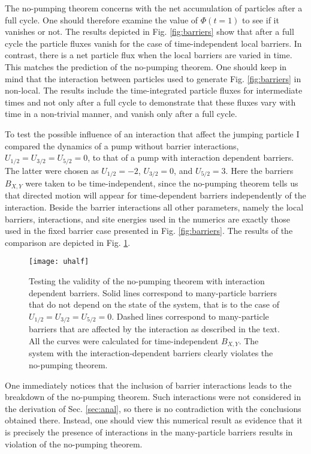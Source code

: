 \documentclass[aps,pre,showpacs,amsmath,amssymb,amsfonts,superscriptaddress,onecolumn,longbibliography]{revtex4-1}
\begin{document}
The no-pumping theorem concerns with the net accumulation of particles after a full cycle. One should therefore examine the value of $\Phi(t=1)$ to see if it vanishes or not. The results depicted
in Fig. \ref{fig:barriers} show that after a full cycle the particle fluxes vanish for the case of time-independent local barriers. In contrast, there is a net particle flux when the local barriers are varied in
time. This matches the prediction of the no-pumping theorem. One should keep in mind that the interaction between particles used to generate Fig. \ref{fig:barriers} in non-local.
The results include the time-integrated particle fluxes for intermediate times and not only after a full cycle to demonstrate that these fluxes vary with time in a non-trivial manner, and vanish only after a full cycle.

To test the possible influence of an interaction that affect the jumping particle I compared the dynamics of a pump without barrier interactions,
$U_{1/2}=U_{3/2}=U_{5/2}=0$, to that of a pump with interaction dependent barriers. The latter were chosen as  $U_{1/2}=-2$, $U_{3/2}=0$, and $U_{5/2}=3$. Here the barriers
 $B_{X,Y}$ were taken to be time-independent, since the no-pumping theorem tells us that directed motion will appear for time-dependent barriers independently of the interaction. Beside the barrier interactions all other parameters, namely the local barriers, interactions, and site energies used in the numerics are exactly those
used in the fixed barrier case presented in Fig. \ref{fig:barriers}.
The results of the comparison are depicted in Fig. \ref{fig:uhalf}.
\begin{figure}[h]
\texttt{[image: uhalf]}

\caption{Testing the validity of the no-pumping theorem with interaction dependent barriers. Solid lines correspond to many-particle barriers that do not depend on the state of the system, that is to the case of $U_{1/2}=U_{3/2}=U_{5/2}=0$. Dashed lines correspond to many-particle barriers that are affected by the interaction as described in the text. All the curves were
calculated for time-independent $B_{X,Y}$. The system with the interaction-dependent barriers clearly violates the no-pumping theorem. \label{fig:uhalf}}
\end{figure}

One immediately notices that the inclusion of barrier interactions leads to the breakdown of the no-pumping theorem. Such interactions were not considered
in the derivation of Sec. \ref{sec:anal}, so there is no contradiction with the conclusions obtained there. Instead, one should view this numerical result as evidence that
it is precisely the presence of interactions in the many-particle barriers
results in violation of the no-pumping theorem.
\end{document}
